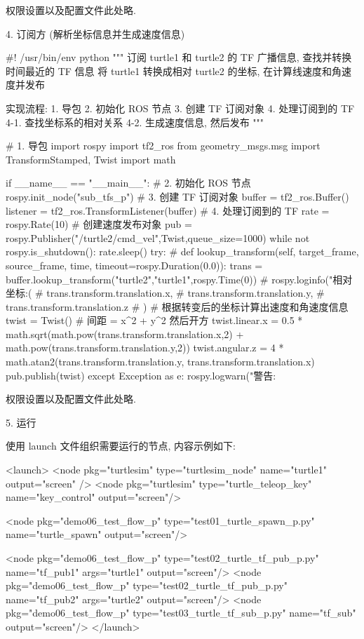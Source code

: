 \documentclass[openany, fontset=windowsold]{ctexbook}
\theoremstyle{kaiti}
\theoremstyle{normal}
\begin{document}
权限设置以及配置文件此处略.

4. 订阅方 (解析坐标信息并生成速度信息)

\begin{python}
  #! /usr/bin/env python
  """  
      订阅 turtle1 和 turtle2 的 TF 广播信息, 查找并转换时间最近的 TF 信息
      将 turtle1 转换成相对 turtle2 的坐标, 在计算线速度和角速度并发布

      实现流程:
          1. 导包
          2. 初始化 ROS 节点
          3. 创建 TF 订阅对象
          4. 处理订阅到的 TF
              4-1. 查找坐标系的相对关系
              4-2. 生成速度信息, 然后发布
  """

  # 1. 导包
  import rospy
  import tf2_ros
  from geometry_msgs.msg import TransformStamped, Twist
  import math

  if __name__ == "__main__":
      # 2. 初始化 ROS 节点
      rospy.init_node("sub_tfs_p")
      # 3. 创建 TF 订阅对象
      buffer = tf2_ros.Buffer()
      listener = tf2_ros.TransformListener(buffer)
      # 4. 处理订阅到的 TF
      rate = rospy.Rate(10)
      # 创建速度发布对象
      pub = rospy.Publisher("/turtle2/cmd_vel",Twist,queue_size=1000)
      while not rospy.is_shutdown():
          rate.sleep()
          try:
              # def lookup_transform(self, target_frame, source_frame, time, timeout=rospy.Duration(0.0)):
              trans = buffer.lookup_transform("turtle2","turtle1",rospy.Time(0))
              # rospy.loginfo("相对坐标:(%
              #             trans.transform.translation.x,
              #             trans.transform.translation.y,
              #             trans.transform.translation.z
              #             )   
              # 根据转变后的坐标计算出速度和角速度信息
              twist = Twist()
              # 间距 = x^2 + y^2  然后开方
              twist.linear.x = 0.5 * math.sqrt(math.pow(trans.transform.translation.x,2) + math.pow(trans.transform.translation.y,2))
              twist.angular.z = 4 * math.atan2(trans.transform.translation.y, trans.transform.translation.x)
              pub.publish(twist)
          except Exception as e:
              rospy.logwarn("警告:%
\end{python}

权限设置以及配置文件此处略.

5. 运行

使用 launch 文件组织需要运行的节点, 内容示例如下:

\begin{xml}
  <launch>
      <node pkg="turtlesim" type="turtlesim_node" name="turtle1" output="screen" />
      <node pkg="turtlesim" type="turtle_teleop_key" name="key_control" output="screen"/>

      <node pkg="demo06_test_flow_p" type="test01_turtle_spawn_p.py" name="turtle_spawn" output="screen"/>

      <node pkg="demo06_test_flow_p" type="test02_turtle_tf_pub_p.py" name="tf_pub1" args="turtle1" output="screen"/>
      <node pkg="demo06_test_flow_p" type="test02_turtle_tf_pub_p.py" name="tf_pub2" args="turtle2" output="screen"/>
      <node pkg="demo06_test_flow_p" type="test03_turtle_tf_sub_p.py" name="tf_sub" output="screen"/>
  </launch>
\end{xml}
\end{document}
